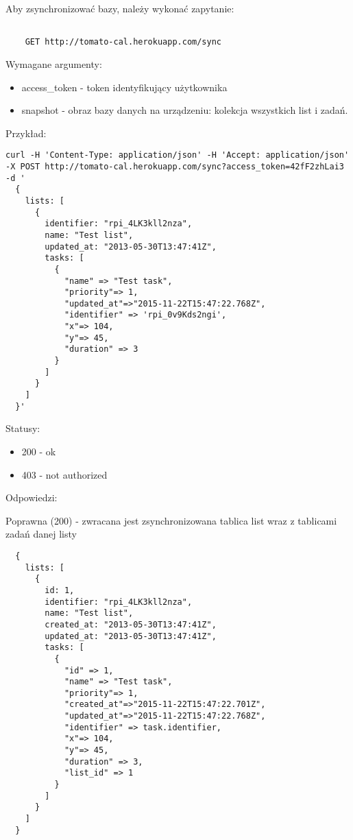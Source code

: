 Aby zsynchronizować bazy, należy wykonać zapytanie:

\begin{lstlisting}

    GET http://tomato-cal.herokuapp.com/sync
\end{lstlisting}

Wymagane argumenty:

\begin{itemize}
  \item access\_token - token identyfikujący użytkownika
  \item snapshot - obraz bazy danych na urządzeniu: kolekcja wszystkich list i zadań.
\end{itemize}

Przykład:

\begin{lstlisting}
curl -H 'Content-Type: application/json' -H 'Accept: application/json' -X POST http://tomato-cal.herokuapp.com/sync?access_token=42fF2zhLai3 -d '
  {
    lists: [
      {
        identifier: "rpi_4LK3kll2nza",
        name: "Test list",
        updated_at: "2013-05-30T13:47:41Z",
        tasks: [
          {
            "name" => "Test task",
            "priority"=> 1,
            "updated_at"=>"2015-11-22T15:47:22.768Z",
            "identifier" => 'rpi_0v9Kds2ngi',
            "x"=> 104,
            "y"=> 45,
            "duration" => 3
          }
        ]
      }
    ]
  }'

\end{lstlisting}

Statusy:

\begin{itemize}
  \item 200 - ok
  \item 403 - not authorized
\end{itemize}

Odpowiedzi:

Poprawna (200) - zwracana jest zsynchronizowana tablica list wraz z tablicami zadań danej listy

\begin{lstlisting}
  {
    lists: [
      {
        id: 1,
        identifier: "rpi_4LK3kll2nza",
        name: "Test list",
        created_at: "2013-05-30T13:47:41Z",
        updated_at: "2013-05-30T13:47:41Z",
        tasks: [
          {
            "id" => 1,
            "name" => "Test task",
            "priority"=> 1,
            "created_at"=>"2015-11-22T15:47:22.701Z",
            "updated_at"=>"2015-11-22T15:47:22.768Z",
            "identifier" => task.identifier,
            "x"=> 104,
            "y"=> 45,
            "duration" => 3,
            "list_id" => 1
          }
        ]
      }
    ]
  }
\end{lstlisting}
